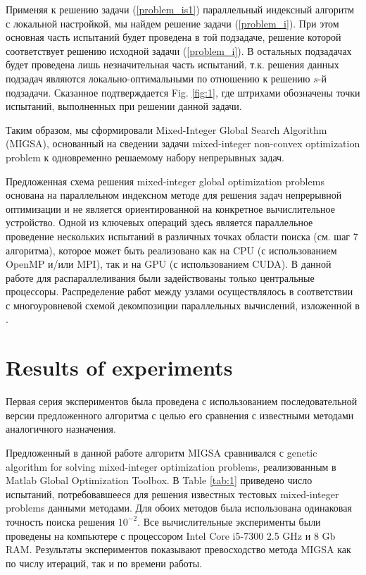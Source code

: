 \documentclass[
11pt,%
tightenlines,%
twoside,%
onecolumn,%
nofloats,%
nobibnotes,%
nofootinbib,%
superscriptaddress,%
noshowpacs,%
centertags]%
{revtex4}
\begin{document}
Применяя к решению задачи (\ref{problem_is1}) параллельный индексный алгоритм с локальной настройкой, мы найдем решение задачи (\ref{problem_i}). При этом основная часть испытаний будет проведена в той подзадаче, решение которой соответствует решению исходной задачи (\ref{problem_i}). В остальных подзадачах будет проведена лишь незначительная часть испытаний, т.к. решения данных подзадач являются локально-оптимальными по отношению к решению $s$-й подзадачи. Сказанное подтверждается Fig. \ref{fig:1}, где штрихами обозначены точки испытаний, выполненных при решении данной задачи.

Таким образом, мы сформировали Mixed-Integer Global Search Algorithm (MIGSA), основанный на сведении задачи mixed-integer non-convex optimization problem к одновременно решаемому набору непрерывных задач.

Предложенная схема решения mixed-integer global optimization problems основана на параллельном индексном методе для решения задач непрерывной оптимизации и не является ориентированной на конкретное вычислительное устройство. Одной из ключевых операций здесь является параллельное проведение нескольких испытаний в различных точках области поиска (см. шаг 7 алгоритма), которое может быть реализовано как на CPU (с использованием OpenMP и/или MPI), так и на GPU (с использованием CUDA). 
В данной работе для распараллеливания были задействованы только центральные процессоры. Распределение работ между узлами осуществлялось в соответствии с многоуровневой схемой декомпозиции параллельных вычислений, изложенной в \cite{Strongin2018,Barkalov2020}.

\section{Results of experiments}

Первая серия экспериментов была проведена с использованием последовательной версии предложенного алгоритма с целью его сравнения с известными методами аналогичного назначения.

Предложенный в данной работе алгоритм MIGSA сравнивался с genetic algorithm for solving mixed-integer optimization problems, реализованным в Matlab Global Optimization Toolbox. В Table \ref{tab:1} приведено число испытаний, потребовавшееся для решения известных тестовых mixed-integer problems данными методами. Для обоих методов была использована одинаковая точность поиска решения $10^{-2}$. Все вычислительные эксперименты были проведены на компьютере с процессором Intel Core i5-7300 2.5 GHz и 8 Gb RAM. Результаты экспериментов показывают превосходство метода MIGSA как по числу итераций, так и по времени работы.
\end{document}
